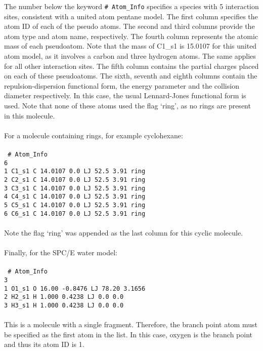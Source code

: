 %
The number below the keyword \texttt{\# Atom\_Info} specifies a species with 5 interaction sites, consistent with a united atom pentane model. 
The first column specifies the atom ID of each of the pseudo atoms.
The second and third columns provide the atom type and atom name, respectively.
The fourth column represents the atomic mass of each pseudoatom. Note that the mass of
C1\_s1 is 15.0107 for this united atom model, as it involves a carbon and three hydrogen atoms. 
The same applies for all other interaction sites.
The fifth column contains the partial charges placed on each of these pseudoatoms.
The sixth, seventh and eighth columns contain the repulsion-dispersion functional form, the energy parameter
and the collision diameter respectively. In this case, the usual Lennard-Jones functional form is used. 
Note that none of these atoms used the flag `ring', as no rings
are present in this molecule. \\ \\
%
For a molecule containing rings, for example cyclohexane: \\ \\
%
\texttt{
\# Atom\_Info \\
6\\
1    C1\_s1    C    14.0107    0.0    LJ    52.5    3.91 ring\\
2    C2\_s1    C    14.0107    0.0    LJ    52.5    3.91 ring\\
3    C3\_s1    C    14.0107    0.0    LJ    52.5    3.91 ring\\
4    C4\_s1    C    14.0107    0.0    LJ    52.5    3.91 ring\\
5    C5\_s1    C    14.0107    0.0    LJ    52.5    3.91 ring\\
6    C6\_s1    C    14.0107    0.0    LJ    52.5    3.91 ring\\
}
\\
%
Note the flag `ring' was appended as the last column for this cyclic molecule. \\ \\
%
Finally, for the SPC/E water model:  \\ \\
%
\texttt{
\# Atom\_Info\\
3\\
1    O1\_s1    O    16.00     -0.8476    LJ    78.20   3.1656\\
2    H2\_s1    H    1.000      0.4238    LJ    0.0 0.0\\
3    H3\_s1    H    1.000      0.4238    LJ    0.0 0.0\\
} \\ 
%
This is a molecule with a single fragment. Therefore, the branch point atom
must be specified as the first atom in the list. In this case, oxygen is the 
branch point and thus its atom ID is 1.

